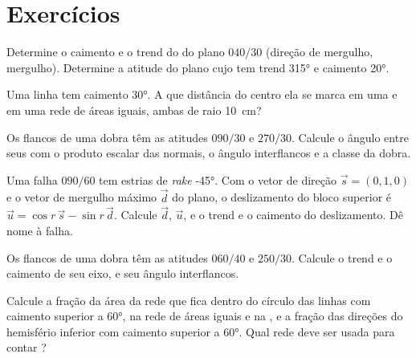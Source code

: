 \section{Exercícios}

\begin{exercise}[$\star$]\label{exo:b3:structural-analysis:1}
Determine o caimento e o trend do  do plano $040/30$ (direção de mergulho,
mergulho). Determine a atitude do plano cujo  tem trend \ang{315} e caimento
\ang{20}.
\end{exercise}

\begin{exercise}[$\star$]\label{exo:b3:structural-analysis:2}
Uma linha tem caimento \ang{30}. A que distância do centro ela se marca em uma  e em uma rede de áreas iguais, ambas de raio \qty{10}{cm}?
\end{exercise}

\begin{exercise}[$\star$]\label{exo:b3:structural-analysis:3}
Os flancos de uma dobra têm as atitudes $090/30$ e $270/30$. Calcule o ângulo entre
seus  com o produto escalar das normais, o ângulo interflancos e a classe da
dobra.
\end{exercise}

\begin{exercise}[$\star$]\label{exo:b3:structural-analysis:4}
Uma falha $090/60$ tem estrias de \textit{rake} \ang{-45}. Com o vetor de direção
$\vec s = (0, 1, 0)$ e o vetor de mergulho máximo $\vec d$ do plano, o
deslizamento do bloco superior é $\vec u = \cos r\,\vec s - \sin r\,\vec d$. Calcule
$\vec d$, $\vec u$, e o trend e o caimento do deslizamento. Dê nome à falha.
\end{exercise}

\begin{exercise}[$\star\star$]\label{exo:b3:structural-analysis:5}
Os flancos de uma dobra têm as atitudes $060/40$ e $250/30$. Calcule o trend e o
caimento de seu eixo, e seu ângulo interflancos.
\end{exercise}

\begin{exercise}[$\star\star$]\label{exo:b3:structural-analysis:6}
Calcule a fração da área da rede que fica dentro do círculo das linhas com caimento
superior a \ang{60}, na rede de áreas iguais e na , e a fração
das direções do hemisfério inferior com caimento superior a \ang{60}. Qual rede deve
ser usada para contar ?
\end{exercise}


